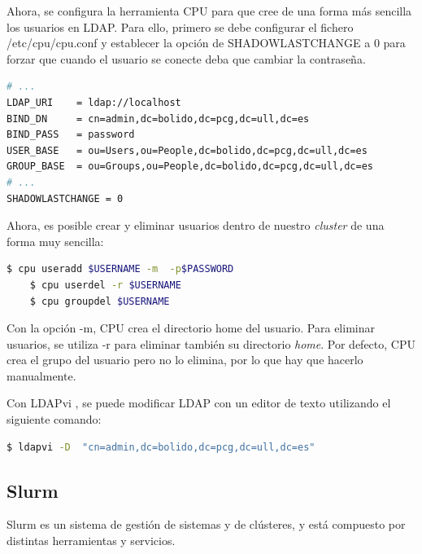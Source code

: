 Ahora, se configura la herramienta CPU \cite{ldapcpu} para que cree de una forma más sencilla los usuarios en LDAP. Para ello, primero se debe configurar el fichero /etc/cpu/cpu.conf y establecer la opción de SHADOWLASTCHANGE a 0 para forzar que cuando el usuario se conecte deba que cambiar la contraseña.

\vspace{4mm}
\begin{lstlisting}[language=bash,caption={fichero /etc/cpu/cpu.conf}]
# ...
LDAP_URI    = ldap://localhost
BIND_DN     = cn=admin,dc=bolido,dc=pcg,dc=ull,dc=es
BIND_PASS   = password
USER_BASE   = ou=Users,ou=People,dc=bolido,dc=pcg,dc=ull,dc=es
GROUP_BASE  = ou=Groups,ou=People,dc=bolido,dc=pcg,dc=ull,dc=es
# ...
SHADOWLASTCHANGE = 0
\end{lstlisting}
\vspace{4mm}

Ahora, es posible crear y eliminar usuarios dentro de nuestro \emph{cluster} de una forma muy sencilla:

\vspace{6mm}
\begin{lstlisting}[language=bash]
    $ cpu useradd $USERNAME -m  -p$PASSWORD
    $ cpu userdel -r $USERNAME
    $ cpu groupdel $USERNAME
\end{lstlisting}
\vspace{4mm}

Con la opción -m, CPU crea el directorio home del usuario. Para eliminar usuarios, se utiliza -r para eliminar también su directorio \emph{home}. Por defecto, CPU crea el grupo del usuario pero no lo elimina, por lo que hay que hacerlo manualmente.
\vspace{4mm}

Con LDAPvi \cite{ldapvi}, se puede modificar LDAP con un editor de texto utilizando el siguiente comando:

\begin{lstlisting}[language=bash]
    $ ldapvi -D  "cn=admin,dc=bolido,dc=pcg,dc=ull,dc=es"
\end{lstlisting}

\subsection{Slurm}

Slurm \cite{slurmquickstart} es un sistema de gestión de sistemas y de clústeres, y está compuesto por distintas herramientas y servicios.
\vspace{4mm}

